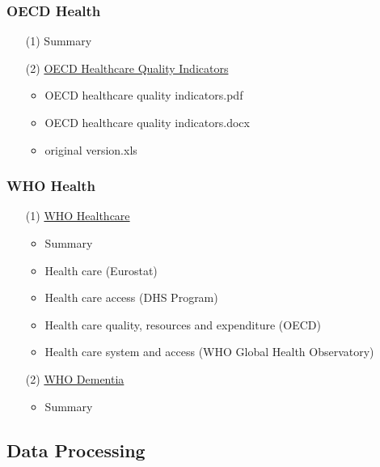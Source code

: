\documentclass[12pt]{article}
\begin{document}
\subsubsection{OECD Health}
\begin{itemize}
    \item[(1)] Summary 
    \item[(2)] \href{https://stats.oecd.org/Index.aspx?QueryId=51879}{OECD Healthcare Quality Indicators}
    \begin{itemize}
        \item OECD healthcare quality indicators.pdf
        \item OECD healthcare quality indicators.docx
        \item original version.xls
    \end{itemize}
\end{itemize}



\subsubsection{WHO Health}
\begin{itemize}
    \item[(1)] \href{https://www.who.int/data/inequality-monitor/data#PageContent_C691_Col00}{WHO Healthcare}
    \begin{itemize}
        \item Summary
        \item Health care (Eurostat)
        \item Health care access (DHS Program)
        \item Health care quality, resources and expenditure (OECD)
        \item Health care system and access (WHO Global Health Observatory)
    \end{itemize}
    \item[(2)] \href{https://www.who.int/data/inequality-monitor/data}{WHO Dementia}
    \begin{itemize}
        \item Summary
    \end{itemize}
\end{itemize}





\subsection{Data Processing}
\end{document}
